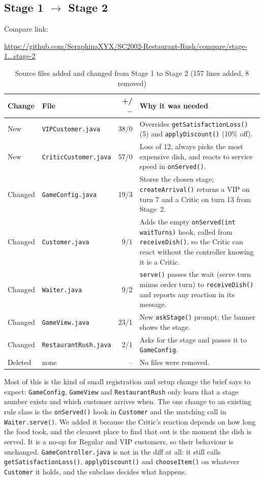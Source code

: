 \subsection{Stage 1 $\rightarrow$ Stage 2}

Compare link:
\begin{center}{\small\url{https://github.com/SeraphinaXYX/SC2002-Restaurant-Rush/compare/stage-1...stage-2}}\end{center}

\begin{table}[H]
\centering
\small
\begin{tabularx}{\textwidth}{l l r X}
\toprule
\textbf{Change} & \textbf{File} & \textbf{+/$-$} & \textbf{Why it was needed} \\
\midrule
New & \texttt{VIPCustomer.java} & 38/0 & Overrides \texttt{getSatisfactionLoss()} (5) and \texttt{applyDiscount()} (10\% off). \\
New & \texttt{CriticCustomer.java} & 57/0 & Loss of 12, always picks the most expensive dish, and reacts to service speed in \texttt{onServed()}. \\
Changed & \texttt{GameConfig.java} & 19/3 & Stores the chosen stage; \texttt{createArrival()} returns a VIP on turn 7 and a Critic on turn 13 from Stage~2. \\
Changed & \texttt{Customer.java} & 9/1 & Adds the empty \texttt{onServed(int waitTurns)} hook, called from \texttt{receiveDish()}, so the Critic can react without the controller knowing it is a Critic. \\
Changed & \texttt{Waiter.java} & 9/2 & \texttt{serve()} passes the wait (serve turn minus order turn) to \texttt{receiveDish()} and reports any reaction in its message. \\
Changed & \texttt{GameView.java} & 23/1 & New \texttt{askStage()} prompt; the banner shows the stage. \\
Changed & \texttt{RestaurantRush.java} & 2/1 & Asks for the stage and passes it to \texttt{GameConfig}. \\
Deleted & none & -- & No files were removed. \\
\bottomrule
\end{tabularx}
\caption{Source files added and changed from Stage 1 to Stage 2 (157 lines added, 8 removed)}
\end{table}

Most of this is the kind of small registration and setup change the brief says to expect: \texttt{GameConfig},
\texttt{GameView} and \texttt{RestaurantRush} only learn that a stage number exists and which customer arrives when.
The one change to an existing rule class is the \texttt{onServed()} hook in \texttt{Customer} and the matching call in
\texttt{Waiter.serve()}. We added it because the Critic's reaction depends on how long the food took, and the
cleanest place to find that out is the moment the dish is served. It is a no-op for Regular and VIP customers,
so their behaviour is unchanged. \texttt{GameController.java} is not in the diff at all: it still calls
\texttt{getSatisfactionLoss()}, \texttt{applyDiscount()} and \texttt{chooseItem()} on whatever \texttt{Customer}
it holds, and the subclass decides what happens.

